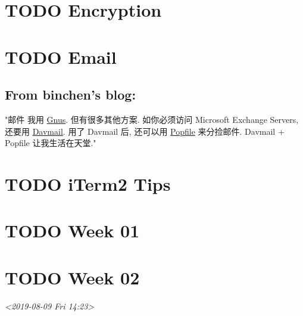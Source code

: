 \documentclass[11pt]{article}
\begin{document}
\section{{\bfseries\sffamily TODO} Encryption}
\label{sec:orgb4f50fd}
\section{{\bfseries\sffamily TODO} Email}
\label{sec:org18e7a76}
\subsection{From binchen's blog:}
\label{sec:org3838a20}

"邮件
我用 \href{http://www.gnus.org/}{Gnus}. 但有很多其他方案.
如你必须访问 Microsoft Exchange Servers, 还要用 \href{http://davmail.sourceforge.net/}{Davmail}.
用了 Davmail 后, 还可以用 \href{http://getpopfile.org/}{Popfile} 来分捡邮件. Davmail + Popfile 让我生活在天堂."
\section{{\bfseries\sffamily TODO} iTerm2 Tips}
\label{sec:org9c053d0}


\section{{\bfseries\sffamily TODO} Week 01}
\label{sec:org0bfce3a}

\section{{\bfseries\sffamily TODO} Week 02}
\label{sec:org1808f9a}
\textit{<2019-08-09 Fri 14:23>}
\end{document}
